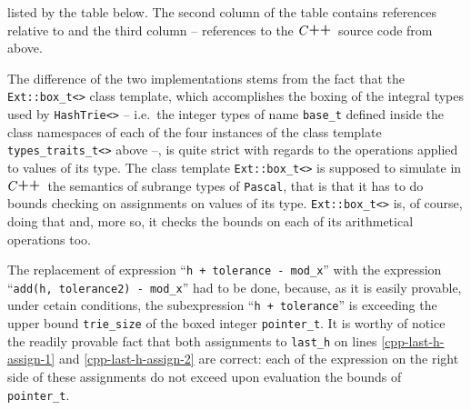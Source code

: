 \documentclass[a4paper,11pt]{article}
\renewcommand{\=}{\protect\nobreakdash-\hspace{0pt}}
\renewcommand{\~}{\protect\nobreakdash--\hspace{0pt}}
\newcommand{\plusplus}{\textbf{\raisebox{1pt}{++}}}
\newcommand{\cplusplus}{$C\plusplus$}
\newcommand{\pascal}{\code{Pascal}}
\newcommand{\ie}{i.e.}
\newcommand{\code}[1]{{\tt{#1}}}
\newcommand\code*[1]{\mbox{\code{#1}}}
\newcommand{\pg}[1]{p.~#1}
\newcommand{\lno}[1]{\mbox{$\#$\hspace{1pt}#1}}
\newcommand{\para}[1]{\mbox{\S\hspace{1pt}#1}}
\newcommand{\cppinline}[1]{%
	{\lstinline[
		style=cpplistingstyle,
		basicstyle=\ttfamily,
		postbreak=,
		prebreak=,
	]{#1}}%
}
\newcommand{\erow}{\\\dashrule}%
\newcommand{\desc}[1]{\\\multi{3}{##1}}%
\newcommand{\erow}{\\\dashrule}%
\newcommand{\pgparalno}[3]{\pg{##1}, \para{##2}, \lno{##3}}%
\newcommand{\pgreflno}[1]{p.~\pageref{##1}, \lno{\ref{##1}}}%
\newcommand{\desc}[1]{\\\multi{4}{##1}}%
\begin{document}
listed by the table below. The second column of the table contains references
relative to \cite{knuth:literate} and the third column -- references to the
\cplusplus\ source code from above.
%
%
The difference of the two implementations stems from the fact that the
\code{Ext::box\_t<>} class template, which accomplishes the boxing of the integral
types used by \code{HashTrie<>} -- \ie\ the integer types of name \code{base\_t}
defined inside the class namespaces of each of the four instances of the class
template \code{types\_traits\_t<>} above --, is quite strict with regards
to the operations applied to values of its type. The class template
\code{Ext::box\_t<>} is supposed to simulate in \cplusplus\ the semantics
of subrange types of \pascal, that is that it has to do bounds checking
on assignments on values of its type. \code{Ext::box\_t<>} is, of course,
doing that and, more so, it checks the bounds on each of its arithmetical
operations too.

The replacement of expression ``\code{h + tolerance - mod\_x}''  with the
expression ``\code{add(h, tolerance2) - mod\_x}'' had to be done, because,
as it is easily provable, under cetain conditions, the subexpression
``\code{h + tolerance}'' is exceeding the upper bound \code{trie\_size}
of the boxed integer \code{pointer\_t}. It is worthy of notice the readily
provable fact that both assignments to \code{last\_h} on lines
\ref{cpp-last-h-assign-1} and \ref{cpp-last-h-assign-2} are correct:
each of the expression on the right side of these assignments do not
exceed upon evaluation the bounds of \code{pointer\_t}.
\end{document}

